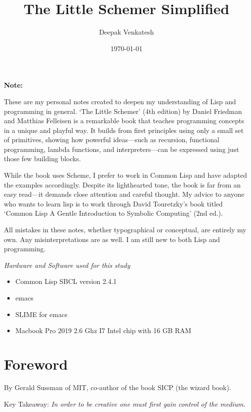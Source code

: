 \documentclass[11pt]{article}
\author{Deepak Venkatesh}
\date{\today}
\title{The Little Schemer Simplified}
\begin{document}
\maketitle
\tableofcontents

\newpage
\textbf{Note:}

\vspace{1em}

These are my personal notes created to deepen my understanding of Lisp and programming in general. `The Little Schemer'
(4th edition) by Daniel Friedman and Matthias Felleisen is a remarkable book that teaches programming concepts in a
unique and playful way. It builds from first principles using only a small set of primitives, showing how powerful
ideas—such as recursion, functional programming, lambda functions, and interpreters—can be expressed using just
those few building blocks.

While the book uses Scheme, I prefer to work in Common Lisp and have adapted the examples accordingly. Despite its
lighthearted tone, the book is far from an easy read—it demands close attention and careful thought. My advice to anyone
who wants to learn lisp is to work through David Touretzky's book titled `Common Lisp A Gentle Introduction to
Symbolic Computing' (2nd ed.).

All mistakes in these notes, whether typographical or conceptual, are entirely my own. Any misinterpretations are as
well. I am still new to both Lisp and programming.

\vspace{1em}

\emph{Hardware and Software used for this study}
\begin{itemize}
\item Common Lisp SBCL version 2.4.1
\item emacs
\item SLIME for emacs
\item Macbook Pro 2019 2.6 Ghz I7 Intel chip with 16 GB RAM
\end{itemize}

\newpage
\section{Foreword}
\label{sec:org6e63724}

By Gerald Sussman of MIT, co-author of the book SICP (the wizard book).

\vspace{1em}

Key Takeaway:
\emph{In order to be creative one must first gain control of the medium.}
\end{document}
